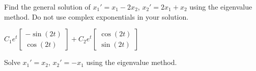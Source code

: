 \begin{exercise}
Find the general solution of $x_1' = x_1 -2 x_2$,
$x_2' = 2 x_1 + x_2$ using the eigenvalue method.
Do not use complex exponentials in your solution.
\end{exercise}
\comboSol{%
}
{%
$C_1e^t\left[\begin{smallmatrix} -\sin(2t)\\ \cos(2t) \end{smallmatrix}\right] + C_2e^{t}\left[\begin{smallmatrix} \cos(2t) \\ \sin(2t) \end{smallmatrix}\right]$ \hfill{}\hfill\hfill
}

\begin{exercise}\ansMark%
Solve $x_1' = x_2$, $x_2' = -x_1$ using the eigenvalue method.
\end{exercise}

